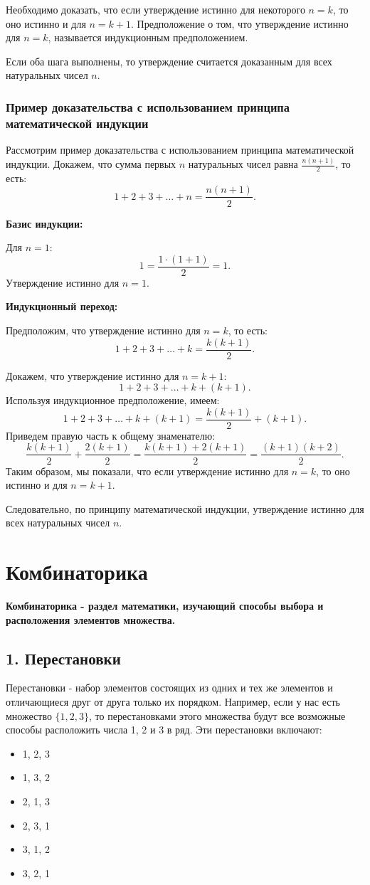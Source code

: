 \documentclass{article}
\begin{document}
Необходимо доказать, что если утверждение истинно для некоторого \( n = k \), то оно истинно и для \( n = k + 1 \). Предположение о том, что утверждение истинно для \( n = k \), называется индукционным предположением.

Если оба шага выполнены, то утверждение считается доказанным для всех натуральных чисел \( n \).

\subsubsection*{Пример доказательства с использованием принципа математической индукции}

Рассмотрим пример доказательства с использованием принципа математической индукции. Докажем, что сумма первых \( n \) натуральных чисел равна \( \frac{n(n+1)}{2} \), то есть:
\[
1 + 2 + 3 + \ldots + n = \frac{n(n+1)}{2}.
\]

\textbf{Базис индукции:}

Для \( n = 1 \):
\[
1 = \frac{1 \cdot (1+1)}{2} = 1.
\]
Утверждение истинно для \( n = 1 \).

\textbf{Индукционный переход:}

Предположим, что утверждение истинно для \( n = k \), то есть:
\[
1 + 2 + 3 + \ldots + k = \frac{k(k+1)}{2}.
\]

Докажем, что утверждение истинно для \( n = k + 1 \):
\[
1 + 2 + 3 + \ldots + k + (k + 1).
\]
Используя индукционное предположение, имеем:
\[
1 + 2 + 3 + \ldots + k + (k + 1) = \frac{k(k+1)}{2} + (k + 1).
\]
Приведем правую часть к общему знаменателю:
\[
\frac{k(k+1)}{2} + \frac{2(k+1)}{2} = \frac{k(k+1) + 2(k+1)}{2} = \frac{(k+1)(k+2)}{2}.
\]
Таким образом, мы показали, что если утверждение истинно для \( n = k \), то оно истинно и для \( n = k + 1 \).

Следовательно, по принципу математической индукции, утверждение истинно для всех натуральных чисел \( n \).
\pagebreak

\section*{Комбинаторика}  
\textbf{ Комбинаторика - раздел математики, изучающий способы выбора и расположения элементов множества.}

\subsection*{1. Перестановки}
Перестановки - набор элементов состоящих из одних и тех же элементов и отличающиеся друг от друга только их порядком.
Например, если у нас есть множество \(\{1, 2, 3\}\), то перестановками этого множества будут все возможные способы расположить числа 1, 2 и 3 в ряд. Эти перестановки включают:
\begin{itemize}
    \item 1, 2, 3
    \item 1, 3, 2
    \item 2, 1, 3
    \item 2, 3, 1
    \item 3, 1, 2
    \item 3, 2, 1
\end{itemize}
\end{document}
